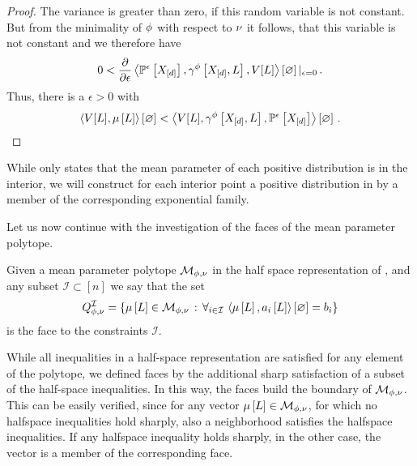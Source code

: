 \begin{proof}
    The variance is greater than zero, if this random variable is not constant.
    But from the minimality of $\phi$ with respect to $\nu$ it follows, that this variable is not constant and we therefore have
    \begin{align*}
        0 < \frac{\partial }{\partial \epsilon} \left\langle \mathbb{P}^{\epsilon}\left[X_{[d]}\right],\gamma^{\phi}\left[X_{[d]},L\right],V[L]\right\rangle \left[ \varnothing \right]|_{\epsilon=0} \, .
    \end{align*}
    Thus, there is a $\epsilon>0$ with
    \begin{align*}
        \left\langle V[L],\mu\left[L\right]\right\rangle \left[ \varnothing \right] < \left\langle V[L],\gamma^{\phi}\left[X_{[d]},L\right],\mathbb{P}^{\epsilon}\left[X_{[d]}\right]\right\rangle \left[ \varnothing \right] \, .
    \end{align*}

\end{proof}

%
While  only states that the mean parameter of each positive distribution is in the interior, we will construct for each interior point a positive distribution in  by a member of the corresponding exponential family.





Let us now continue with the investigation of the faces of the mean parameter polytope.%

\begin{definition}
    \label{def:meanPolytopeFaces}
    Given a mean parameter polytope $\mathcal{M}_{\phi,\nu}$ in the half space representation of , and any subset $\mathcal{I}\subset[n]$ we say that the set
    \begin{align*}
        Q^{\mathcal{I}}_{\phi,\nu}
        = \left\{\mu\left[L\right]\in\mathcal{M}_{\phi,\nu} \,:\, \forall_{i\in\mathcal{I}} \, \left\langle \mu\left[L\right],a_{i}\left[L\right]\right\rangle \left[ \varnothing \right]=b_{i} \right\}
    \end{align*}
    is the face to the constraints $\mathcal{I}$.
\end{definition}

While all inequalities in a half-space representation are satisfied for any element of the polytope, we defined faces by the additional sharp satisfaction of a subset of the half-space inequalities.
In this way, the faces build the boundary of $\mathcal{M}_{\phi,\nu}$.
This can be easily verified, since for any vector $\mu\left[L\right]\in\mathcal{M}_{\phi,\nu}$, for which no halfspace inequalities hold sharply, also a neighborhood satisfies the halfspace inequalities.
If any halfspace inequality holds sharply, in the other case, the vector is a member of the corresponding face.

